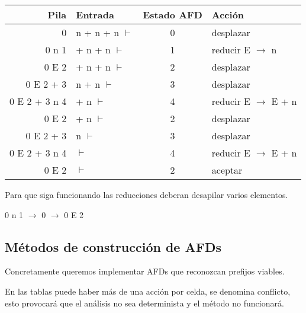 \documentclass[\main/ApuntesPL.tex]{subfiles}
\begin{document}
    \begin{center}
      \begin{tabular}{||r l c l||}
        \hline
        Pila & Entrada & Estado AFD & Acción \\ [0.5ex]
        \hline\hline
        {\color{red}0} & n + n + n $\vdash$ & 0 & desplazar \\
        \hline
        {\color{red}0} n {\color{red}1} & + n + n $\vdash$ & 1 & reducir E
          $\rightarrow$ n \\
        \hline
        {\color{red}0} E {\color{red}2} & + n + n $\vdash$ & 2 & desplazar \\
        \hline
        {\color{red}0} E {\color{red}2} + {\color{red}3} & n + n $\vdash$ & 3 &
          desplazar \\
        \hline
        {\color{red}0} E {\color{red}2} + {\color{red}3} n {\color{red}4} & + n
          $\vdash$ & 4 & reducir E $\rightarrow$ E + n \\
        \hline
        {\color{red}0} E {\color{red}2} & + n $\vdash$ & 2 & desplazar \\
        \hline
        {\color{red}0} E {\color{red}2} + {\color{red}3} & n $\vdash$ & 3 &
          desplazar \\
        \hline
        {\color{red}0} E {\color{red}2} + {\color{red}3} n {\color{red}4} &
          $\vdash$ & 4 & reducir E $\rightarrow$ E + n \\
        \hline
        {\color{red}0} E {\color{red}2} & $\vdash$ & 2 & aceptar \\ [1ex]
        \hline
      \end{tabular}
    \end{center}

    \par
    Para que siga funcionando las reducciones deberan desapilar {\color{blue}
    varios elementos}.\\
    \begin{center}
      0 {\color{blue}n 1} $\rightarrow$ 0 $\rightarrow$ 0 E 2
    \end{center}

    \subsection{Métodos de construcción de AFDs}
      \par
      Concretamente queremos implementar AFDs que reconozcan prefijos viables.

      \bigskip
      \par
      En las tablas puede haber más de una acción por celda, se denomina
      conflicto, esto provocará que el análisis no sea determinista y el método
      no funcionará.
\end{document}

